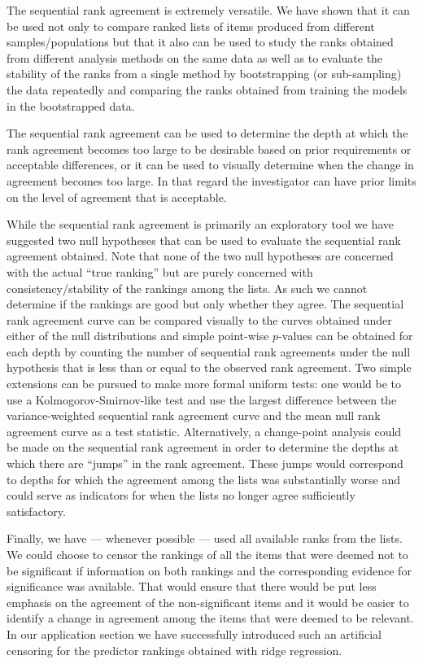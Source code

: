 \documentclass[12pt,a4paper]{article}
\theoremstyle{plain}
\begin{document}
The sequential rank agreement is extremely versatile. We have shown
that it can be used not only to compare ranked lists of items produced
from different samples/populations but that it also can be used to
study the ranks obtained from different analysis methods on the same
data as well as to evaluate the stability of the ranks from a single
method by bootstrapping (or sub-sampling) the data repeatedly and
comparing the ranks obtained from training the models in the
bootstrapped data.

The sequential rank agreement can be used to determine the depth at
which the rank agreement becomes too large to be desirable based on
prior requirements or acceptable differences, or it can be used to
visually determine when the change in agreement becomes too large.  In
that regard the investigator can have prior limits on the level of
agreement that is acceptable.

While the sequential rank agreement is primarily an exploratory tool
we have suggested two null hypotheses that can be used to evaluate the
sequential rank agreement obtained. Note that none of the two null
hypotheses are concerned with the actual ``true ranking'' but are
purely concerned with consistency/stability of the rankings among the
lists. As such we cannot determine if the rankings are good but only
whether they agree. The sequential rank agreement curve can be
compared visually to the curves obtained under either of the null
distributions and simple point-wise $p$-values can be obtained for
each depth by counting the number of sequential rank agreements under
the null hypothesis that is less than or equal to the observed rank
agreement. Two simple extensions can be pursued to make more formal
uniform tests: one would be to use a Kolmogorov-Smirnov-like test and
use the largest difference between the variance-weighted sequential
rank agreement curve and the mean null rank agreement curve as a test
statistic. Alternatively, a change-point analysis could be made on the
sequential rank agreement in order to determine the depths at which
there are ``jumps'' in the rank agreement. These jumps would
correspond to depths for which the agreement among the lists was
substantially worse and could serve as indicators for when the lists
no longer agree sufficiently satisfactory.

Finally, we have --- whenever possible --- used all available ranks
from the lists.  We could choose to censor the rankings of all the
items that were deemed not to be significant if information on both
rankings and the corresponding evidence for significance was
available. That would ensure that there would be put less emphasis on
the agreement of the non-significant items and it would be easier to
identify a change in agreement among the items that were deemed to
be relevant. In our application section we have successfully introduced
such an artificial censoring for the predictor rankings obtained with
ridge regression.
\end{document}
